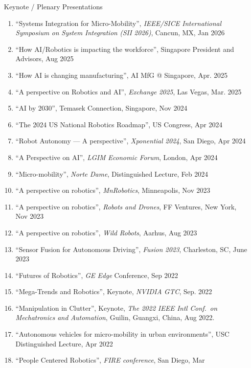 \documentclass{article}
\begin{document}
\begin{cv}
	\begin{cvlist}{Keynote / Plenary Presentations}
		\item
		\begin{enumerate}
			\item ``Systems Integration for Micro-Mobility'', {\em IEEE/SICE
					      International Symposium on System Integration (SII 2026)},
				Cancun, MX, Jan 2026
		    \item ``How AI/Robotics is impacting the workforce'', Singapore
				President and Advisors, Aug 2025
			\item ``How AI is changing manufacturing'', AI MfG @ Singapore, Apr. 2025
			\item ``A perspective on Robotics and AI'', {\em Exchange 2025}, Las
			      Vegas, Mar. 2025
			\item ``AI by 2030'', Temasek Connection, Singapore, Nov 2024
			\item ``The 2024 US National Robotics Roadmap'', US Congress, Apr 2024
			\item ``Robot Autonomy --- A perspective'', {\em Xponential 2024}, San Diego, Apr 2024
			\item ``A Perspective on AI'', {\em LGIM Economic Forum}, London, Apr 2024
			\item ``Micro-mobility'', {\em Norte Dame}, Distinguished Lecture, Feb 2024
			\item ``A perspective on robotics'', {\em MnRobotics}, Minneapolis, Nov 2023
			\item ``A perspective on robotics'', {\em Robots and Drones}, FF Ventures, New
			      York, Nov 2023
			\item ``A perspective on robotics'', {\em Wild Robots}, Aarhus, Aug 2023
			\item ``Sensor Fusion for Autonomous Driving'', {\em Fusion 2023}, Charleston,
			      SC, June 2023
			\item ``Futures of Robotics'', {\em GE Edge\/} Conference, Sep 2022
			\item ``Mega-Trends and Robotics'', Keynote, {\em NVIDIA GTC}, Sep. 2022
			\item ``Manipulation in Clutter'', Keynote, {\em The 2022 IEEE Intl Conf.\ on
					      Mechatronics and Automation}, Guilin, Guangxi, China, Aug 2022.
			\item ``Autonomous vehicles for micro-mobility in urban environments'', USC
			      Distinguished Lecture, Apr 2022
			\item ``People Centered Robotics'', {\em FIRE conference}, San Diego, Mar

\end{enumerate}
\end{cvlist}
\end{cv}
\end{document}
